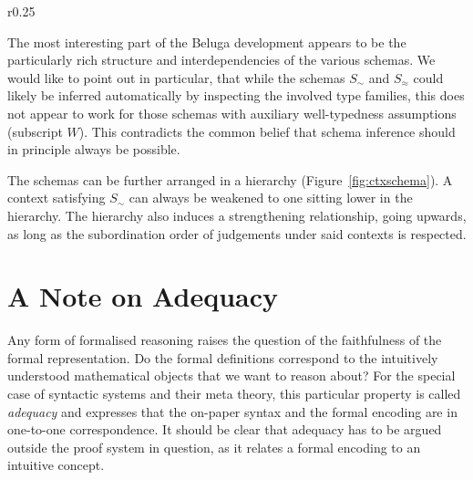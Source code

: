 \documentclass[a4paper,UKenglish]{lipics-v2016}
\newcommand{\tyr}{\mathrel{\sim}}
\newcommand{\tmr}{\mathrel{\approx}}
\theoremstyle{plain}
\begin{document}
\begin{wrapfigure}{r}{0.25\textwidth}
  \centering
  \vspace{-0.5em}
  \caption{Hierarchy of Context Schemas}
  \label{fig:ctxschema}
\end{wrapfigure}

The most interesting part of the Beluga development appears to be the particularly rich structure and interdependencies of the various schemas.
We would like to point out in particular, that while the schemas $S_{\tyr}$ and $S_{\tmr}$ could likely be inferred automatically by inspecting the involved type families, this does not appear to work for those schemas with auxiliary well-typedness assumptions (subscript $W$).
This contradicts the common belief that schema inference should in principle always be possible.

The schemas can be further arranged in a hierarchy (Figure~\ref{fig:ctxschema}).
A context satisfying $S_{\tyr}$ can always be weakened to one sitting lower in the hierarchy.
The hierarchy also induces a strengthening relationship, going upwards, as long as the subordination order of judgements under said contexts is respected.

\section{A Note on Adequacy}
\label{sec:adequacy}

Any form of formalised reasoning raises the question of the faithfulness of the formal representation.
Do the formal definitions correspond to the intuitively understood mathematical objects that we want to reason about?
For the special case of syntactic systems and their meta theory, this particular property is called \emph{adequacy} and expresses that the on-paper syntax and the formal encoding are in one-to-one correspondence.
It should be clear that adequacy has to be argued outside the proof system in question, as it relates a formal encoding to an intuitive concept.
\end{document}
